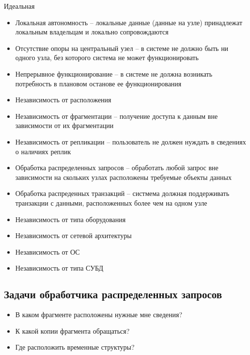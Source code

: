 \documentclass[12pt, a4paper]{article}
\begin{document}
Идеальная 
\begin{itemize}
    \item Локальная автономность -- локальные данные (данные на узле) принадлежат локальным владельцам и локально сопровождаются
    
    \item Отсутствие опоры на центральный узел -- в системе не должно быть ни одного узла, без которого система не может функционировать
    
    \item Непрерывное функционирование -- в системе не должна возникать потребность в плановом останове ее функционирования
    
    \item Независимость от расположения
    
    \item Независимость от фрагментации -- получение доступа к данным
    вне зависимости от их фрагментации
    
    \item Независимость от репликации -- пользователь не должен нуждать в сведениях о наличиях реплик
    
    \item Обработка распределенных запросов -- обработать любой запрос вне зависимости на скольких узлах расположены требуемые объекты данных
    
    \item Обработка распреденных транзакций -- систмема должная поддерживать транзакции с данными, расположенных более чем на одном узле

    \item Независимость от типа оборудования
    
    \item Независимость от сетевой архитектуры
    
    \item Независимость от ОС
    
    \item Независимость от типа СУБД
    
\end{itemize}


\subsection{Задачи обработчика распределенных запросов}

\begin{itemize}
    \item В каком фрагменте расположены нужные мне сведения?
    \item К какой копии фрагмента обращаться?
    \item Где расположить временные структуры?
\end{itemize}
\end{document}
